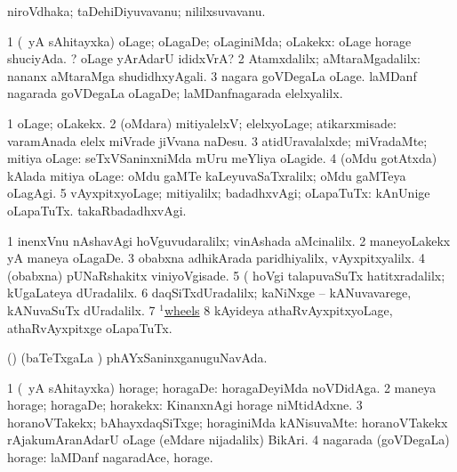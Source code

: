 \bentry 
{} 
\gl{\nA}
\expl{}
\bmng
niroVdhaka; taDehiDiyuvavanu; nililxsuvavanu. 
\emng
\eentry

\bentry
{} 
\gl{\kirxvi}
\expl{}
\bmng
\bnum
\num{1} (\pArxparx\ yA sAhitayxka) oLage; oLagaDe; oLaginiMda; oLakekx:  oLage horage shuciyAda. ? oLage yArAdarU ididxVrA? 
\num{2} Atamxdalilx; aMtaraMgadalilx:  nananx aMtaraMga shudidhxyAgali. 
\num{3} nagara goVDegaLa oLage.  laMDanf nagarada goVDegaLa oLagaDe; laMDanfnagarada elelxyalilx. 
\enum
\emng
\eentry

\bentry
{} 
\gl{\upa}
\expl{}
\bmng
\bnum
\num{1} oLage; oLakekx. 
\num{2} (oMdara) mitiyalelxV; elelxyoLage; atikarxmisade:  varamAnada elelx miVrade jiVvana naDesu. 
\num{3} atidUravalalxde; miVradaMte; mitiya oLage:  seTxVSaninxniMda mUru meYliya oLagide. 
\num{4} (oMdu gotAtxda) kAlada mitiya oLage:  oMdu gaMTe kaLeyuvaSaTxralilx; oMdu gaMTeya oLagAgi. 
\num{5} vAyxpitxyoLage; mitiyalilx; badadhxvAgi; oLapaTuTx:  kAnUnige oLapaTuTx.  takaRbadadhxvAgi. 
\enum
\emng

\noindent
\gl{\pagu}
\expl{}
\bmng
\bnum
\num{1}  inenxVnu nAshavAgi hoVguvudaralilx; vinAshada aMcinalilx. 
\num{2}  maneyoLakekx yA maneya oLagaDe. 
\num{3}  obabxna adhikArada paridhiyalilx, vAyxpitxyalilx. 
\num{4}  (obabxna) pUNaRshakitx viniyoVgisade. 
\num{5}  (  hoVgi talapuvaSuTx hatitxradalilx; kUgaLateya dUradalilx. 
\num{6}  daqSiTxdUradalilx; kaNiNxge -- kANuvavarege, kANuvaSuTx dUradalilx. 
\num{7} \hyperlink{wheel(1) pagu(10)}{$^1$wheels}  
\num{8}  kAyideya athaRvAyxpitxyoLage, athaRvAyxpitxge oLapaTuTx. 
\enum
\emng
\eentry

\bentry
{} 
\gl{\gu}
\expl{}
\bmng
(\AmA) (baTeTxgaLa \vi) phAYxSaninxganuguNavAda. 
\emng
\eentry

\bentry
{} 
\gl{\kirxvi}
\expl{}
\bmng
\bnum
\num{1} (\pArxparx\ yA sAhitayxka) horage; horagaDe:  horagaDeyiMda noVDidAga. 
\num{2} maneya horage; horagaDe; horakekx:  KinanxnAgi horage niMtidAdxne. 
\num{3} horanoVTakekx; bAhayxdaqSiTxge; horaginiMda kANisuvaMte:  horanoVTakekx rAjakumAranAdarU oLage (eMdare nijadalilx) BikAri. 
\num{4} nagarada (goVDegaLa) horage:  laMDanf nagaradAce, horage. 
\enum
\emng

